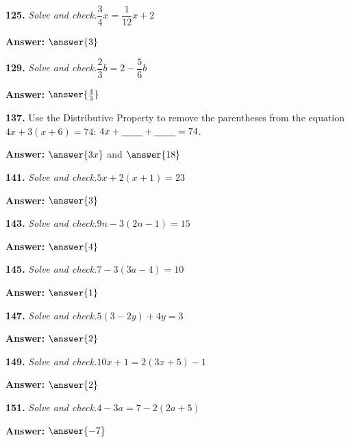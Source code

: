 \documentclass{ximera}
\begin{document}
\begin{problem}
\textbf{125.} \emph{Solve and check.}\quad $\dfrac{3}{4}x = \dfrac{1}{12}x + 2$

\textbf{Answer:} $\answer{3}$
\end{problem}

\begin{problem}
\textbf{129.} \emph{Solve and check.}\quad $\dfrac{2}{3}b = 2 - \dfrac{5}{6}b$

\textbf{Answer:} $\answer{\frac{4}{3}}$
\end{problem}

\begin{problem}
\textbf{137.} Use the Distributive Property to remove the parentheses from the equation
  $4x + 3(x + 6) = 74$: \quad $4x + \underline{\hspace{2.2em}} + \underline{\hspace{2.2em}} = 74$.

\textbf{Answer:} $\answer{3x}$ and $\answer{18}$
\end{problem}

\begin{problem}
\textbf{141.} \emph{Solve and check.}\quad $5x + 2(x + 1) = 23$

\textbf{Answer:} $\answer{3}$
\end{problem}

\begin{problem}
\textbf{143.} \emph{Solve and check.}\quad $9n - 3(2n - 1) = 15$

\textbf{Answer:} $\answer{4}$
\end{problem}

\begin{problem}
\textbf{145.} \emph{Solve and check.}\quad $7 - 3(3a - 4) = 10$

\textbf{Answer:} $\answer{1}$
\end{problem}

\begin{problem}
\textbf{147.} \emph{Solve and check.}\quad $5(3 - 2y) + 4y = 3$

\textbf{Answer:} $\answer{2}$
\end{problem}

\begin{problem}
\textbf{149.} \emph{Solve and check.}\quad $10x + 1 = 2(3x + 5) - 1$

\textbf{Answer:} $\answer{2}$
\end{problem}

\begin{problem}
\textbf{151.} \emph{Solve and check.}\quad $4 - 3a = 7 - 2(2a + 5)$

\textbf{Answer:} $\answer{-7}$
\end{problem}
\end{document}
